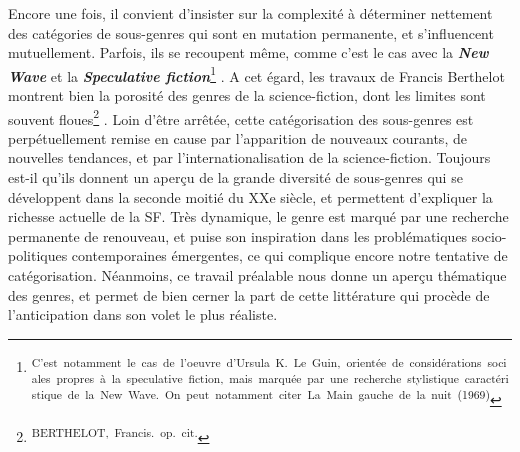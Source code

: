 \documentclass[letterpaper,portrait,12pt]{article}
\begin{document}
	 Encore une fois, il convient d'insister sur la complexit\'{e} \`{a} d\'{e}terminer nettement des cat\'{e}gories de sous-genres qui sont en mutation permanente, et s'influencent mutuellement. Parfois, ils se recoupent m\^{e}me, comme c'est le cas avec la\textbf{\emph{ New Wave}} et la \textbf{\emph{Speculative fiction}}\footnote{\textsuperscript{\newpage
}\textsuperscript{	C'est\ notamment\ le\ cas\ de\ l'oeuvre\ d'Ursula\ K.\ Le\ Guin,\ orient\'{e}e\ de\ consid\'{e}rations\ sociales\ propres\ \`{a}\ la\ speculative\ fiction,\ mais\ marqu\'{e}e\ par\ une\ recherche\ stylistique\ caract\'{e}ristique\ de\ la\ New\ Wave.\ On\ peut\ notamment\ citer\ La\ Main\ gauche\ de\ la\ nuit\ (1969)}} .\textbf{\emph{ }}A cet \'{e}gard, les travaux de Francis Berthelot montrent bien la porosit\'{e} des genres de la science-fiction, dont les limites sont souvent floues\footnote{\textsuperscript{\newpage
}\textsuperscript{	BERTHELOT,\ Francis.\ op.\ cit.}} . Loin d'\^{e}tre arr\^{e}t\'{e}e, cette cat\'{e}gorisation des sous-genres est perp\'{e}tuellement remise en cause par l'apparition de nouveaux courants, de nouvelles tendances, et par l'internationalisation de la science-fiction. Toujours est-il qu'ils donnent un aper\c{c}u de la grande diversit\'{e} de sous-genres qui se d\'{e}veloppent dans la seconde moiti\'{e} du XXe si\`{e}cle, et permettent d'expliquer la richesse actuelle de la SF. Tr\`{e}s dynamique, le genre est marqu\'{e} par une recherche permanente de renouveau, et puise son inspiration dans les probl\'{e}matiques socio-politiques contemporaines \'{e}mergentes, ce qui complique encore notre tentative de cat\'{e}gorisation. N\'{e}anmoins, ce travail pr\'{e}alable nous donne un aper\c{c}u th\'{e}matique des genres, et permet de bien cerner la part de cette litt\'{e}rature qui proc\`{e}de de l'anticipation dans son volet le plus r\'{e}aliste. 





	
\end{document}

